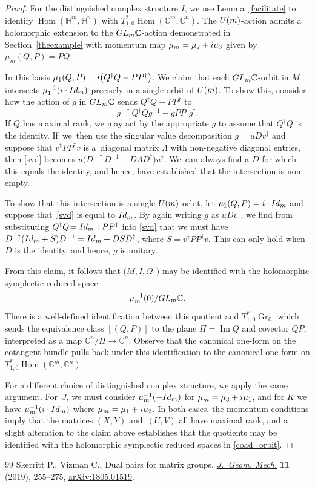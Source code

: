 \documentclass[11pt]{article}
\numberwithin{equation}{section}
\numberwithin{equation}{section}
\DeclareMathOperator{\Imag}{Im}
\DeclareMathOperator{\Hom}{Hom}
\DeclareMathOperator{\Gr}{Gr}
\newcommand{\C}{\mathbb{C}}
\newcommand{\Q}{\mathbb{H}}
\newcommand{\Id}{{\rm Id}}
\begin{document}
\begin{proof}
	For the distinguished complex structure $I$, we use Lemma~\ref{facilitate} to identify $\Hom(\Q^m,\Q^n)$ with ${T^*_{1,0}\Hom(\C^m,\C^n)}$. The ${\rm U}(m)$-action admits a holomorphic extension to the ${\rm GL}_m\C$-action demonstrated in Section~\ref{theexample} with momentum map $\mu_m=\mu_2+{\rm i}\mu_3$ given by $\mu_m(Q,P)=PQ$.
	
	In this basis $\mu_1(Q,P)={\rm i}\bigl(Q^\dagger Q-PP^\dagger\bigr)$. We claim that each ${\rm GL}_m\C$-orbit in $M$ intersects $\mu_1^{-1}({\rm i}\cdot\Id_m)$ precisely in a single orbit of ${\rm U}(m)$. To show this, consider how the action of $g$ in ${\rm GL}_m\C$ sends $Q^\dagger Q-PP^\dagger$ to
	\begin{equation}\label{svd}
		g^{-\dagger}Q^\dagger Qg^{-1}-gPP^\dagger g^{\dagger}.
	\end{equation}
	If $Q$ has maximal rank, we may act by the appropriate $g$ to assume that $Q^\dagger Q$ is the identity. If~we~then use the singular value decomposition $g=uDv^\dagger$ and suppose that $v^\dagger PP^\dagger v$ is a~diagonal matrix $\Lambda$ with non-negative diagonal entries, then \eqref{svd} becomes $u\bigl(D^{-\dagger}D^{-1}-D\Lambda D^\dagger\bigr)u^\dagger$. We~can always find a $D$ for which this equals the identity, and hence, have established that the intersection is non-empty.
	
	To show that this intersection is a single ${\rm U}(m)$-orbit, let $\mu_1(Q,P)={\rm i}\cdot\Id_m$ and suppose that~\eqref{svd} is equal to $\Id_m$. By again writing $g$ as $uDv^\dagger$, we find from substituting ${Q^\dagger Q\!=\Id_m\!+\!PP^\dagger}$ into \eqref{svd} that we must have $D^{-\dagger}(\Id_m+S)D^{-1}=\Id_m+DSD^\dagger$, where $S=v^\dagger PP^\dagger v$. This can only hold when $D$ is the identity, and hence, $g$ is unitary.
	
	From this claim, it follows that $\bigl(\tilde{M},I,\Omega_1\bigr)$ may be identified with the holomorphic symplectic reduced space
	\begin{equation*}%
		\mu_m^{-1}(0)/{\rm GL}_m\C.
	\end{equation*}
	There is a well-defined identification between this quotient and $T^*_{1,0}\Gr_\C$ which sends the equivalence class $[(Q,P)]$ to the plane $\Pi=\Imag Q$ and covector $QP$, interpreted as a map $\C^n/\Pi\rightarrow\C^n$. Observe that the canonical one-form on the cotangent bundle pulls back under this identification to the canonical one-form on $T^*_{1,0}\Hom(\C^m,\C^n)$.
	
	For a different choice of distinguished complex structure, we apply the same argument. For~$J$, we must consider $\mu_m^{-1}(-\Id_m)$ for $\mu_m=\mu_3+{\rm i}\mu_1$, and for $K$ we have $\mu_m^{-1}({\rm i}\cdot\Id_m)$ where ${\mu_m=\mu_1+{\rm i}\mu_2}$. In both cases, the momentum conditions imply that the matrices $(X,Y)$ and~$(U,V)$ all have maximal rank, and a slight alteration to the claim above establishes that the quotients may be identified with the holomorphic symplectic reduced spaces in \eqref{coad_orbit}.
\end{proof}
\begin{thebibliography}{99}
Skerritt P., Vizman C., Dual pairs for matrix groups, \href{https://doi.org/10.3934/jgm.2019014}{\textit{J.~Geom. Mech.}}
 \textbf{11} (2019), 255--275, \href{https://arxiv.org/abs/1805.01519}{arXiv:1805.01519}.

\end{thebibliography}
\end{document}
